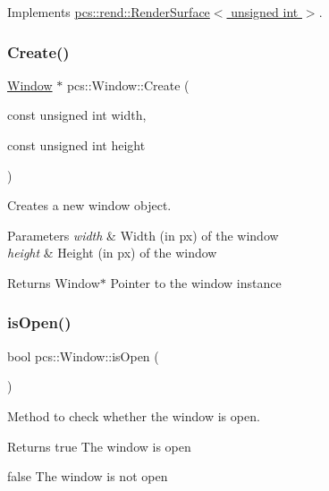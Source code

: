 Implements \hyperlink{classpcs_1_1rend_1_1RenderSurface_a79c0b291ed5a7b901fe4233bf8b376f2}{pcs\+::rend\+::\+Render\+Surface$<$ unsigned int $>$}.

\mbox{\label{classpcs_1_1Window_af7ab7d729e559b42fb723c57670623da}} 
\subsubsection{\texorpdfstring{Create()}{Create()}}
{\footnotesize\ttfamily \hyperlink{classpcs_1_1Window}{Window} $\ast$ pcs\+::\+Window\+::\+Create (\begin{DoxyParamCaption}\item[{const unsigned int}]{width,  }\item[{const unsigned int}]{height }\end{DoxyParamCaption})\hspace{0.3cm}{\ttfamily [static]}}



Creates a new window object. 


\begin{DoxyParams}{Parameters}
{\em width} & Width (in px) of the window \\
\hline
{\em height} & Height (in px) of the window \\
\hline
\end{DoxyParams}
\begin{DoxyReturn}{Returns}
Window$\ast$ Pointer to the window instance 
\end{DoxyReturn}
\mbox{\label{classpcs_1_1Window_a594d19fb488754f3e863e982ad540928}} 
\subsubsection{\texorpdfstring{is\+Open()}{isOpen()}}
{\footnotesize\ttfamily bool pcs\+::\+Window\+::is\+Open (\begin{DoxyParamCaption}{ }\end{DoxyParamCaption})}



Method to check whether the window is open. 

\begin{DoxyReturn}{Returns}
true The window is open 

false The window is not open 
\end{DoxyReturn}
\mbox{\label{classpcs_1_1Window_a3017fae4b567ecad9f41189b9b8f0281}} 
